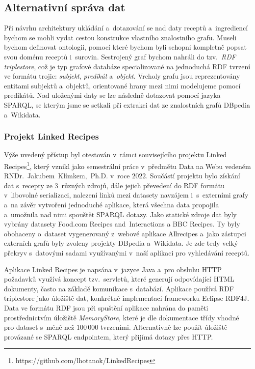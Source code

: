 \subsection{Alternativní správa dat}

Při návrhu architektury ukládání a~dotazování se nad daty receptů a~ingrediencí bychom se mohli vydat cestou konstrukce vlastního znalostního grafu. Museli bychom definovat ontologii, pomocí které bychom byli schopni kompletně popsat svou doménu receptů i~surovin. Sestrojený graf bychom nahráli do tzv.~\emph{RDF triplestore}, což je typ grafové databáze specializované na jednoduchá RDF tvrzení ve formátu trojic: \emph{subjekt}, \emph{predikát} a~\emph{objekt}. Vrcholy grafu jsou reprezentovány entitami subjektů a~objektů, orientované hrany mezi nimi modelujeme pomocí predikátů. Nad uloženými daty se lze následně dotazovat pomocí jazyka SPARQL, se kterým jsme se setkali při extrakci dat ze znalostních grafů DBpedia a~Wikidata.

\subsubsection{Projekt Linked Recipes}

Výše uvedený přístup byl otestován v~rámci souvisejícího projektu Linked \,Recipes\footnote{https://github.com/lhotanok/LinkedRecipes}, který vznikl jako semestrální práce v~předmětu Data na Webu vedeném RNDr.~Jakubem~Klímkem,~Ph.D. v~roce $2022$. Součástí projektu bylo získání dat s~recepty ze $3$~různých zdrojů, dále jejich převedení do RDF formátu v~libovolné serializaci, nalezení linků mezi datasety navzájem i~s~externími grafy a~na závěr vytvoření jednoduché aplikace, která všechna data propojila a~umožnila nad nimi spouštět SPARQL dotazy. Jako statické zdroje dat byly vybrány datasety Food.com Recipes and~Interactions a BBC Recipes. Ty byly obohaceny o~dataset vygenerovaný z~webové aplikace Allrecipes a~jako zástupci externích grafů byly zvoleny projekty DBpedia a~Wikidata. Je zde tedy velký překryv s~datovými sadami využívanými v~naší aplikaci pro vyhledávání receptů.

Aplikace Linked Recipes je napsána v~jazyce Java a~pro obsluhu HTTP požadavků využívá koncept tzv.~servletů, které generují odpovídající HTML dokumenty, často na základě komunikace s~databází. Aplikace používá RDF triplestore jako úložiště dat, konkrétně implementaci frameworku Eclipse RDF4J. Data ve formátu RDF jsou při spuštění aplikace nahrána do paměti prostřednictvím úložiště \emph{MemoryStore}, které je dle dokumentace třídy vhodné pro dataset s~méně než $100\,000$ tvrzeními. Alternativně lze použít úložiště provázané se SPARQL endpointem, který přijímá dotazy přes HTTP.

